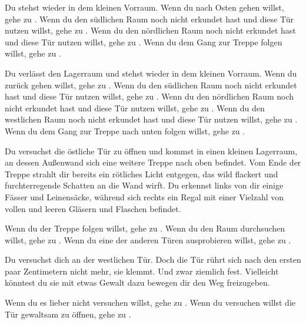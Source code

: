 
Du stehst wieder in dem kleinen Vorraum. Wenn du nach Osten gehen willst, gehe zu .
Wenn du den südlichen Raum noch nicht erkundet hast und diese Tür nutzen willst, gehe zu .
Wenn du den nördlichen Raum noch nicht erkundet hast und diese Tür nutzen willst, gehe zu .
Wenn du dem Gang zur Treppe folgen willst, gehe zu .


Du verlässt den Lagerraum und stehst wieder in dem kleinen Vorraum. Wenn du zurück gehen willst, gehe zu .
Wenn du den südlichen Raum noch nicht erkundet hast und diese Tür nutzen willst, gehe zu .
Wenn du den nördlichen Raum noch nicht erkundet hast und diese Tür nutzen willst, gehe zu .
Wenn du den westlichen Raum noch nicht erkundet hast und diese Tür nutzen willst, gehe zu .
Wenn du dem Gang zur Treppe nach unten folgen willst, gehe zu .


Du versuchst die östliche Tür zu öffnen und kommst in einen kleinen Lagerraum, an dessen Außenwand sich eine weitere Treppe nach oben befindet. Vom Ende der Treppe strahlt dir bereits ein rötliches Licht entgegen, das wild flackert und furchterregende Schatten an die Wand wirft.
Du erkennst links von dir einige Fässer und Leinensäcke, während sich rechts ein Regal mit einer Vielzahl von vollen und leeren Gläsern und Flaschen befindet.

Wenn du der Treppe folgen willst, gehe zu .
Wenn du den Raum durchsuchen willst, gehe zu .
Wenn du eine der anderen Türen ausprobieren willst, gehe zu .




Du versuchst dich an der westlichen Tür. Doch die Tür rührt sich nach den ersten paar Zentimetern nicht mehr, sie klemmt. Und zwar ziemlich fest. Vielleicht könntest du sie mit etwas Gewalt dazu bewegen dir den Weg freizugeben.

Wenn du es lieber nicht versuchen willst, gehe zu .
Wenn du versuchen willst die Tür gewaltsam zu öffnen, gehe zu .

